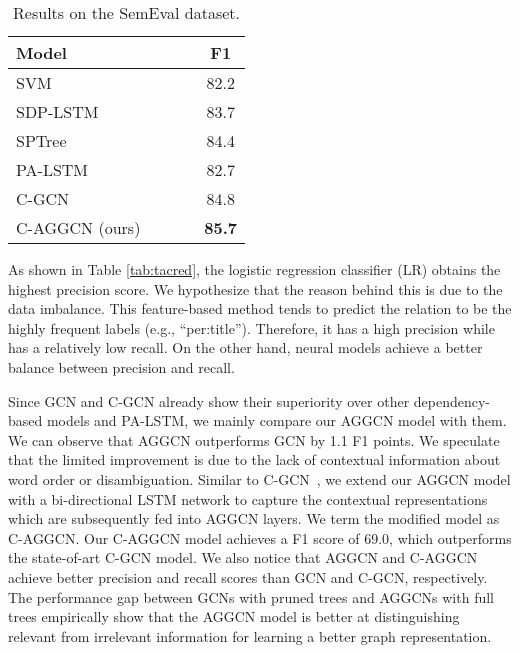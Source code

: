 \documentclass[11pt,a4paper]{article}
\begin{document}
\begin{table}[!t]
\centering
\setlength{\tabcolsep}{3pt}
\begin{tabular}{lcccc}
\toprule
\bf Model & & & &F1 \\
\midrule
SVM~\citep{Rink2010UTDCS}               & & & & 82.2\\
SDP-LSTM~\citep{Xu2015ClassifyingRV}    & & & & 83.7\\
SPTree~\citep{Miwa2016EndtoEndRE}       & & & & 84.4\\
PA-LSTM~\citep{Zhang2017PositionawareAA}& & & & 82.7\\
C-GCN~\citep{Zhang2018GraphCO}          & & & & 84.8\\
\midrule
C-AGGCN (ours)                           & & & &\textbf{85.7}    \\
\bottomrule
\end{tabular}
\caption{Results on the SemEval dataset. }
\label{tab:semeval}
\end{table}


 
As shown in Table \ref{tab:tacred}, the logistic regression classifier (LR) obtains the highest precision score. We hypothesize that the reason behind this is due to the data imbalance. This feature-based method tends to predict the relation to be the highly frequent labels (e.g., ``per:title''). Therefore, it has a high precision while has a relatively low recall. On the other hand, neural models achieve a better balance between precision and recall.

Since GCN and C-GCN already show their superiority over other dependency-based models and PA-LSTM, we mainly compare our AGGCN model with them.  We can observe that  AGGCN outperforms GCN by 1.1 F1 points. We speculate that the limited improvement is due to  the lack of contextual information about word order or disambiguation.  Similar to C-GCN~\citep{Zhang2018GraphCO}, we extend our AGGCN model with  a bi-directional LSTM network to capture the contextual representations which are subsequently fed into AGGCN layers. We term the modified model as C-AGGCN.  Our C-AGGCN model achieves a F1 score of 69.0, which outperforms the state-of-art C-GCN model.  We also notice that AGGCN and C-AGGCN achieve better precision and recall scores than GCN and C-GCN, respectively. The performance gap between GCNs with pruned trees and AGGCNs with full trees  empirically show that the AGGCN model is better at distinguishing relevant from irrelevant information for learning a better graph representation.
\end{document}
